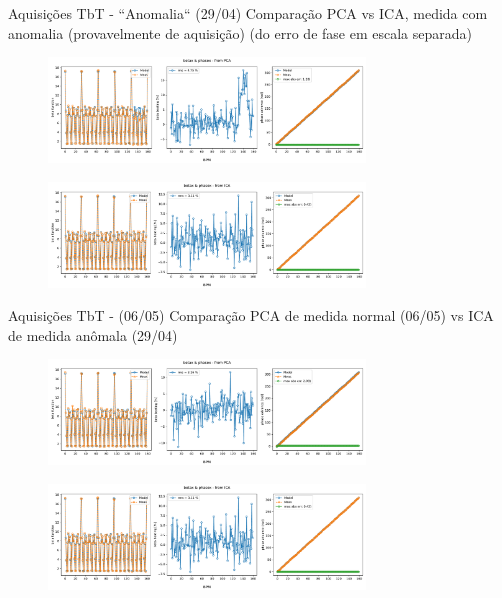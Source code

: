 \documentclass[aspectratio=169]{beamer}            %
\begin{document}
\begin{frame}{Aquisições TbT - ``Anomalia`` (29/04)}
{\tiny Comparação PCA vs ICA, medida com anomalia (provavelmente de aquisição) (do erro de fase em escala separada) } 
    \begin{figure}
        \centering
        \includegraphics[width=0.75\textwidth]{2024-05-31/figures/beta_beat_PCA_050urad_kickh_290424.pdf}
    \end{figure}
    \begin{figure}
        \centering
        \includegraphics[width=0.75\textwidth]{2024-05-31/figures/beta_beat_ICA_050urad_kickh_290424.pdf}
    \end{figure}
\end{frame}

\begin{frame}{Aquisições TbT - (06/05)}
{\tiny Comparação PCA de medida normal (06/05) vs ICA de medida anômala (29/04)}
\begin{figure}
        \centering
        \includegraphics[width=0.75\textwidth]{2024-05-31/figures/beta_beat_PCA_100urad_kickh_060524.pdf}
    \end{figure}
    \begin{figure}
        \centering
        \includegraphics[width=0.75\textwidth]{2024-05-31/figures/beta_beat_ICA_050urad_kickh_290424.pdf}
    \end{figure}
\end{frame}
\end{document}
